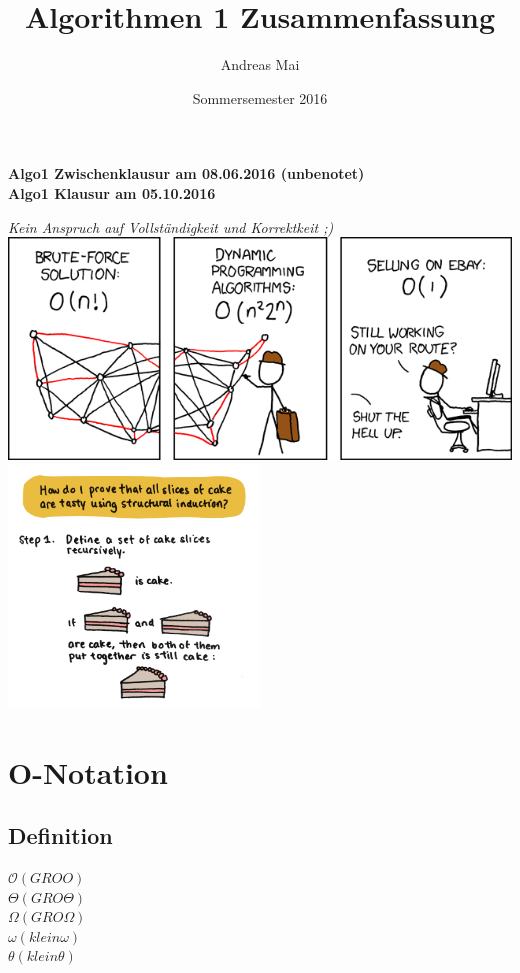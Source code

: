 \documentclass[a4paper,portrait]{scrartcl}
\title{Algorithmen 1 Zusammenfassung}
\author{Andreas Mai}
\date{Sommersemester 2016}
\begin{document}
\maketitle
\begin{center}
\textbf{Algo1 Zwischenklausur am 08.06.2016 (unbenotet)} \\
\textbf{Algo1 Klausur am 05.10.2016} \\
\end{center}


\begin{center}
\textit{Kein Anspruch auf Vollständigkeit und Korrektkeit ;)} \\

\includegraphics[width=\textwidth]{travelling_salesman_problem}
\includegraphics[width=0.5\textwidth]{graphics_cake-induction}
\end{center}\clearpage
\tableofcontents
\clearpage
\setcounter{page}{1}
\section{O-Notation}
\subsection{Definition}
$\mathcal O(GRO O)$ \\
$\Theta(GRO \Theta)$ \\
$\Omega(GRO \Omega)$ \\
$\omega(klein \omega)$ \\
$\theta(klein \theta)$ \\
\end{document}
